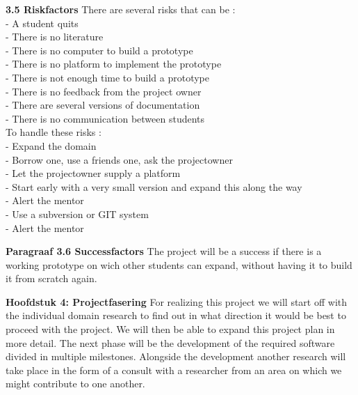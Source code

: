 \documentclass{article}
\begin{document}
\noindent
\textbf{3.5 Riskfactors}
\newline
There are several risks that can be :\\
- A student quits\\
- There is no literature\\
- There is no computer to build a prototype\\
- There is no platform to implement the prototype\\
- There is not enough time to build a prototype\\
- There is no feedback from the project owner\\
- There are several versions of documentation\\
- There is no communication between students\\
\newline
To handle these risks :\\
- Expand the domain\\
- Borrow one, use a friends one, ask the projectowner\\
- Let the projectowner supply a platform\\
- Start early with  a very small version and expand this along the way\\
- Alert the mentor\\
- Use a subversion or GIT system\\
- Alert the mentor\\
\newline

\noindent
\textbf{Paragraaf 3.6 Successfactors}
\newline
The project will be a success if there is a working prototype on wich other students can expand, without having it to build it from scratch again.
\newline

\textbf{Hoofdstuk 4: Projectfasering}
For realizing this project we will start off with the individual domain research to find out in what direction it would be best to proceed with the project. We will then be able to expand this project plan in more detail. The next phase will be the development of the required software divided in multiple milestones. Alongside the development another research will take place in the form of a consult with a researcher from an area on which we might contribute to one another.
\newline
\end{document}
